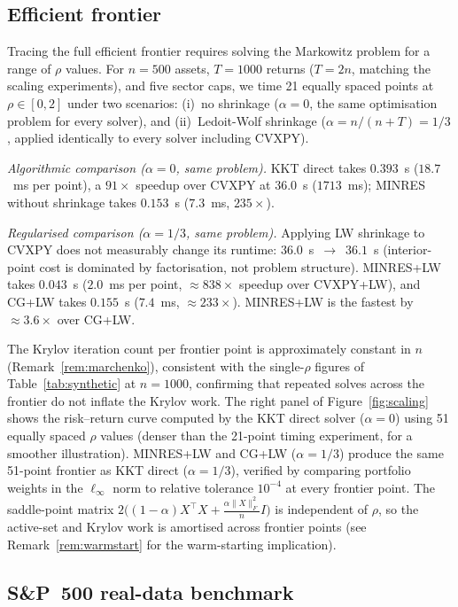 \documentclass{siam/siamart}
\begin{document}
\subsection{Efficient frontier}\label{sec:frontier}

Tracing the full efficient frontier requires solving the Markowitz problem for a
range of $\rho$ values.  For $n=500$ assets, $T=1000$ returns ($T = 2n$, matching
the scaling experiments), and five sector caps, we time 21 equally spaced points at
$\rho \in [0, 2]$ under two scenarios: (i)~no shrinkage ($\alpha=0$, the same
optimisation problem for every solver), and (ii)~Ledoit-Wolf shrinkage
($\alpha = n/(n+T) = 1/3$, applied identically to every solver including CVXPY).

\textit{Algorithmic comparison ($\alpha=0$, same problem).}
KKT direct takes $0.393$~s ($18.7$~ms per point), a $91\times$ speedup over
CVXPY at $36.0$~s ($1713$~ms); MINRES without shrinkage takes $0.153$~s
($7.3$~ms, $235\times$).

\textit{Regularised comparison ($\alpha=1/3$, same problem).}
Applying LW shrinkage to CVXPY does not measurably change its runtime:
$36.0$~s~$\to$~$36.1$~s (interior-point cost is dominated by factorisation, not
problem structure).  MINRES+LW takes $0.043$~s ($2.0$~ms per point,
${\approx}838\times$ speedup over CVXPY+LW), and CG+LW takes $0.155$~s
($7.4$~ms, ${\approx}233\times$).  MINRES+LW is the fastest by
${\approx}3.6\times$ over CG+LW.

The Krylov iteration count per frontier point is approximately constant in $n$
(Remark~\ref{rem:marchenko}), consistent with the single-$\rho$ figures of
Table~\ref{tab:synthetic} at $n=1000$, confirming that repeated solves across
the frontier do not inflate the Krylov work.  The right panel of
Figure~\ref{fig:scaling} shows the risk--return curve computed by the KKT direct
solver ($\alpha=0$) using 51 equally spaced $\rho$ values (denser than the
21-point timing experiment, for a smoother illustration).  MINRES+LW and CG+LW ($\alpha=1/3$)
produce the same 51-point frontier as KKT direct ($\alpha=1/3$), verified by
comparing portfolio weights in the $\ell_\infty$ norm to relative tolerance $10^{-4}$
at every frontier point.  The saddle-point matrix
$2\bigl((1-\alpha)X^\top X + \tfrac{\alpha\|X\|_F^2}{n}I\bigr)$ is independent of
$\rho$, so the active-set and Krylov work is amortised across frontier points
(see Remark~\ref{rem:warmstart} for the warm-starting implication).

\subsection{S\&P~500 real-data benchmark}
\end{document}
